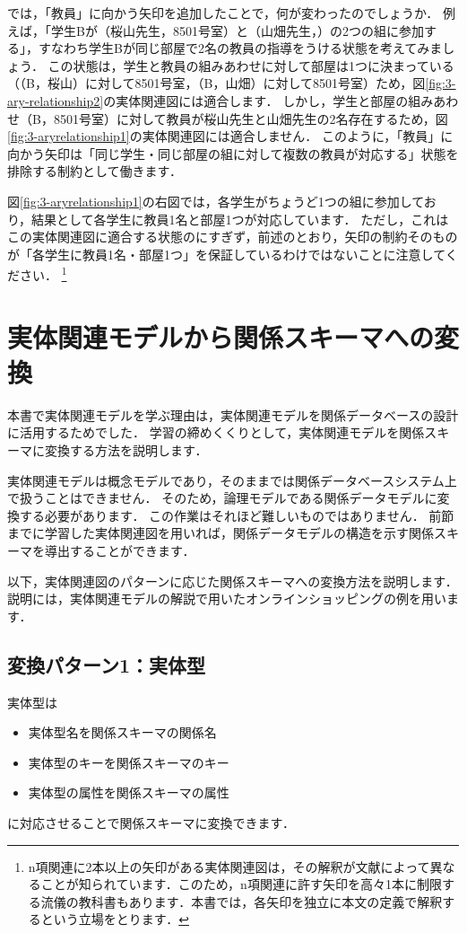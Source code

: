 では，「教員」に向かう矢印を追加したことで，何が変わったのでしょうか．
例えば，「学生Bが（桜山先生，8501号室）と（山畑先生，）の2つの組に参加する」，すなわち学生Bが同じ部屋で2名の教員の指導をうける状態を考えてみましょう．
この状態は，学生と教員の組みあわせに対して部屋は1つに決まっている（（B，桜山）に対して8501号室，（B，山畑）に対して8501号室）ため，図\ref{fig:3-ary-relationship2}の実体関連図には適合します．
しかし，学生と部屋の組みあわせ（B，8501号室）に対して教員が桜山先生と山畑先生の2名存在するため，図\ref{fig:3-aryrelationship1}の実体関連図には適合しません．
このように，「教員」に向かう矢印は「同じ学生・同じ部屋の組に対して複数の教員が対応する」状態を排除する制約として働きます．

図\ref{fig:3-aryrelationship1}の右図では，各学生がちょうど1つの組に参加しており，結果として各学生に教員1名と部屋1つが対応しています．
ただし，これはこの実体関連図に適合する状態のにすぎず，前述のとおり，矢印の制約そのものが「各学生に教員1名・部屋1つ」を保証しているわけではないことに注意してください．
\footnote{n項関連に2本以上の矢印がある実体関連図は，その解釈が文献によって異なることが知られています．このため，n項関連に許す矢印を高々1本に制限する流儀の教科書もあります．本書では，各矢印を独立に本文の定義で解釈するという立場をとります．}


\section{実体関連モデルから関係スキーマへの変換}\label{sec:erd-to-relational-model}
本書で実体関連モデルを学ぶ理由は，実体関連モデルを関係データベースの設計に活用するためでした．
学習の締めくくりとして，実体関連モデルを関係スキーマに変換する方法を説明します．

実体関連モデルは概念モデルであり，そのままでは関係データベースシステム上で扱うことはできません．
そのため，論理モデルである関係データモデルに変換する必要があります．
この作業はそれほど難しいものではありません．
前節までに学習した実体関連図を用いれば，関係データモデルの構造を示す関係スキーマを導出することができます．

以下，実体関連図のパターンに応じた関係スキーマへの変換方法を説明します．
説明には，実体関連モデルの解説で用いたオンラインショッピングの例を用います．

\subsection{変換パターン1：実体型}
実体型は
\begin{itemize}
\item 実体型名を関係スキーマの関係名
\item 実体型のキーを関係スキーマのキー
\item 実体型の属性を関係スキーマの属性
\end{itemize}
に対応させることで関係スキーマに変換できます．

